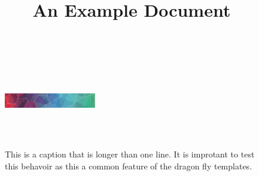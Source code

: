 \documentclass{dragonfly-article}
\title{An Example Document}
\begin{document}
\maketitle


\lipsum[1]


\begin{figure}
  \includegraphics[width=40mm,height=40mm]{pattern}
  \caption{This is a caption that is longer than one line. It is improtant to test 
  this behavoir as this a common feature of the dragon fly templates.}
\end{figure}


\lipsum[2]
\end{document}
